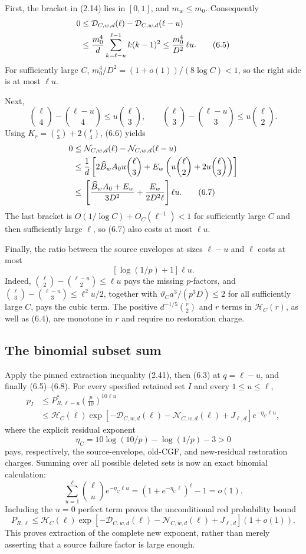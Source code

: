 First, the bracket in (2.14) lies in \([0,1]\), and \(m_w\le m_0\).
Consequently
\begin{align}
0\le{}&\mathcal D_{C,w,d}(\ell)
-\mathcal D_{C,w,d}(\ell-u)\notag\\
\le{}&\frac{m_0^4}{d}
\sum_{k=\ell-u}^{\ell-1}k(k-1)^2
\le\frac{m_0^4}{D^2}\,\ell u.
\tag{6.5}
\end{align}
For sufficiently large \(C\),
\(m_0^4/D^2=(1+o(1))/(8\log C)<1\), so the right side is at most
\(\ell u\).

Next,
\[
 \binom\ell4-\binom{\ell-u}4\le u\binom\ell3,\qquad
 \binom\ell3-\binom{\ell-u}3\le u\binom\ell2.
\tag{6.6}
\]
Using \(K_r=\binom r3+2\binom r4\), (6.6) yields
\begin{align}
0\le{}&\mathcal N_{C,w,d}(\ell)
-\mathcal N_{C,w,d}(\ell-u)\notag\\
\le{}&\frac1d\left[
2\widehat B_wA_0u\binom\ell3
+E_w\left(u\binom\ell2+2u\binom\ell3\right)\right]\notag\\
\le{}&\left[
\frac{\widehat B_wA_0+E_w}{3D^2}
+\frac{E_w}{2D^2\ell}\right]\ell u.
\tag{6.7}
\end{align}
The last bracket is \(O(1/\log C)+O_C(\ell^{-1})<1\) for sufficiently large
\(C\) and then sufficiently large \(\ell\), so
(6.7) also costs at most \(\ell u\).

Finally, the ratio between the source envelopes at sizes \(\ell-u\) and
\(\ell\) costs at most
\[
 \left[\log(1/p)+1\right]\ell u.
\tag{6.8}
\]
Indeed, \(\binom\ell2-\binom{\ell-u}2\le\ell u\) pays the missing
\(p\)-factors, and
\(\binom\ell3-\binom{\ell-u}3\le\ell^2u/2\), together with
\(\vartheta_Ca^3/(p^3D)\le2\) for all sufficiently large \(C\), pays the
cubic term.  The positive \(d^{-1/5}\binom r2\) and \(r\) terms in
\(\mathcal H_C(r)\), as well as (6.4), are monotone in \(r\) and require no
restoration charge.

\subsection{The binomial subset sum}

Apply the pinned extraction inequality (2.41), then (6.3) at
\(q=\ell-u\), and finally (6.5)--(6.8).  For every specified retained set
\(I\) and every \(1\le u\le\ell\),
\[
\begin{aligned}
p_I
&\le P^*_{R,\ell-u}\left(\frac p{10}\right)^{10\ell u}\\
&\le\mathcal H_C(\ell)
\exp\!\left[-\mathcal D_{C,w,d}(\ell)
-\mathcal N_{C,w,d}(\ell)+J_{\ell,d}\right]
e^{-\eta_C\ell u},
\end{aligned}
\tag{6.9}
\]
where the explicit residual exponent
\[
 \eta_C=10\log(10/p)-\log(1/p)-3>0
\tag{6.10}
\]
pays, respectively, the source-envelope, old-CGF, and new-residual
restoration charges.  Summing over all possible deleted sets is now an exact
binomial calculation:
\[
 \sum_{u=1}^{\ell}\binom\ell u e^{-\eta_C\ell u}
 =(1+e^{-\eta_C\ell})^\ell-1=o(1).
\tag{6.11}
\]
Including the \(u=0\) perfect term proves the unconditional red probability
bound
\[
P_{R,\ell}\le\mathcal H_C(\ell)
\exp\!\left[-\mathcal D_{C,w,d}(\ell)
-\mathcal N_{C,w,d}(\ell)+J_{\ell,d}\right](1+o(1)).
\tag{6.12}
\]
This proves extraction of the complete new exponent, rather than merely
asserting that a source failure factor is large enough.
